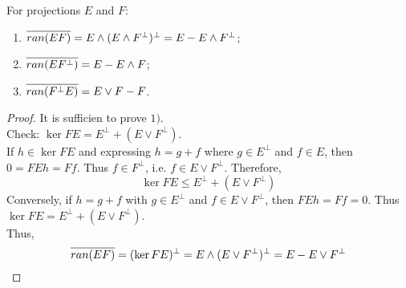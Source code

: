 \begin{lem}
	For projections $E$ and $F$:
	\begin{enumerate}[label=\arabic*)]
		\item $\overline{ran(EF)} = E \wedge (E \wedge F^{\bot})^{\bot} = E - E \wedge F^{\bot}$;
		\item $\overline{ran(EF^{\bot})} = E - E \wedge F$;
		\item $\overline{ran(F^{\bot}E)} = E \vee F - F$.
	\end{enumerate}
\end{lem}
\begin{proof}
	It is sufficien to prove $1)$. \\
	Check: $\ker{FE} = E^{\bot} + (E \vee F^{\bot})$. \\
	If $h \in \ker{FE}$ and expressing $h = g + f$ where $g \in E^{\bot}$ and $f \in E$, then $0 = FEh = Ff$. Thus $f \in F^{\bot}$, i.e. $f \in E \vee F^{\bot}$. Therefore,
	\begin{equation*}
		\ker{FE} \leqslant E^{\bot} + (E \vee F^{\bot})
	\end{equation*}
	Conversely, if $h = g + f$ with $g \in E^{\bot}$ and $f \in E \vee F^{\bot}$, then $FEh = Ff = 0$. Thus $\ker{FE} = E^{\bot} + (E \vee F^{\bot})$. \\
	Thus,
	\begin{equation*}
		\overline{ran(EF)} = (\ker{FE})^{\bot} = E \wedge (E \vee F^{\bot})^{\bot} = E - E \vee F^{\bot} \qedhere
	\end{equation*}
\end{proof}

